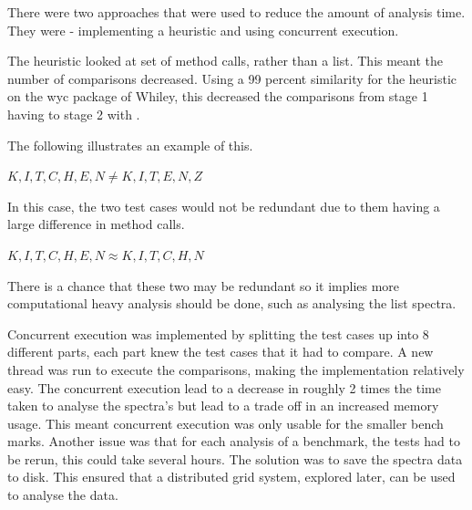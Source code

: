 There were two approaches that were used to reduce the amount of analysis time. They were - implementing a heuristic and using concurrent execution. 

The heuristic looked at set of method calls, rather than a list. This meant the number of comparisons decreased. Using a 99 percent similarity for the heuristic on the wyc package of Whiley, this decreased the comparisons from stage 1 having  to stage 2 with . 

The following illustrates an example of this.

$K,I,T,C,H,E,N \neq K,I,T,E,N,Z $

In this case, the two test cases would not be redundant due to them having a large difference in method calls.

$K,I,T,C,H,E,N \approx K,I,T,C,H,N$

There is a chance that these two may be redundant so it implies more computational heavy analysis should be done, such as analysing the list spectra. 

Concurrent execution was implemented by splitting the test cases up into 8 different parts, each part knew the test cases that it had to compare. A new thread was run to execute the comparisons, making the implementation relatively easy. The concurrent execution lead to a decrease in roughly 2 times the time taken to analyse the spectra's but lead to a trade off in an increased memory usage. This meant concurrent execution was only usable for the smaller bench marks.
Another issue was that for each analysis of a benchmark, the tests had to be rerun, this could take several hours. The solution was to save the spectra data to disk. This ensured that a distributed grid system, explored later, can be used to analyse the data.

